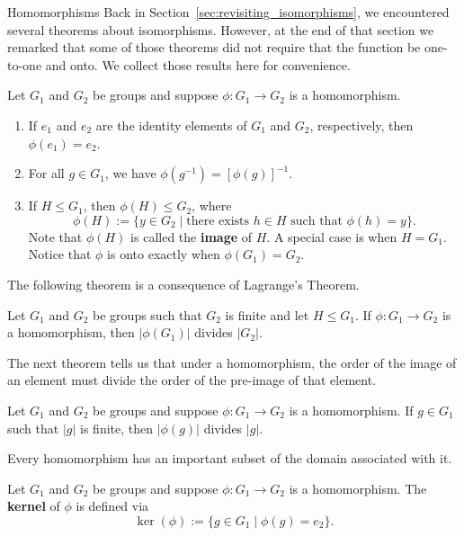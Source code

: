 \begin{section}{Homomorphisms}
Back in Section~\ref{sec:revisiting_isomorphisms}, we encountered several theorems about isomorphisms.  However, at the end of that section we remarked that some of those theorems did not require that the function be one-to-one and onto.  We collect those results here for convenience.

\begin{theorem}
Let $G_1$ and $G_2$ be groups and suppose $\phi:G_1\to G_2$ is a homomorphism.
\begin{enumerate}[label=\rm{(\alph*)}]
\item If $e_1$ and $e_2$ are the identity elements of $G_1$ and $G_2$, respectively, then $\phi(e_1)=e_2$.
\item For all $g\in G_1$, we have $\phi(g^{-1})=[\phi(g)]^{-1}$.
\item If $H\leq G_1$, then $\phi(H)\leq G_2$, where
\[
\phi(H):=\{y\in G_2\mid \text{there exists } h\in H\text{ such that }\phi(h)=y\}. 
\]
Note that $\phi(H)$ is called the \textbf{image} of $H$. A special case is when $H=G_1$. Notice that $\phi$ is onto exactly when $\phi(G_1)=G_2$.
\end{enumerate}
\end{theorem}

The following theorem is a consequence of Lagrange's Theorem.

\begin{theorem}
Let $G_1$ and $G_2$ be groups such that $G_2$ is finite and let $H\leq G_1$. If $\phi:G_1\to G_2$ is a homomorphism, then $|\phi(G_1)|$ divides $|G_2|$.
\end{theorem}

The next theorem tells us that under a homomorphism, the order of the image of an element must divide the order of the pre-image of that element.

\begin{theorem}\label{thm:orderImage}
Let $G_1$ and $G_2$ be groups and suppose $\phi:G_1\to G_2$ is a homomorphism. If $g\in G_1$ such that $|g|$ is finite, then $|\phi(g)|$ divides $|g|$.
\end{theorem}

Every homomorphism has an important subset of the domain associated with it.

\begin{definition}
Let $G_1$ and $G_2$ be groups and suppose $\phi:G_1\to G_2$ is a homomorphism.  The \textbf{kernel} of $\phi$ is defined via
\[
\ker(\phi):=\{g\in G_1\mid \phi(g)=e_2\}.
\]
\end{definition}


\end{section}
